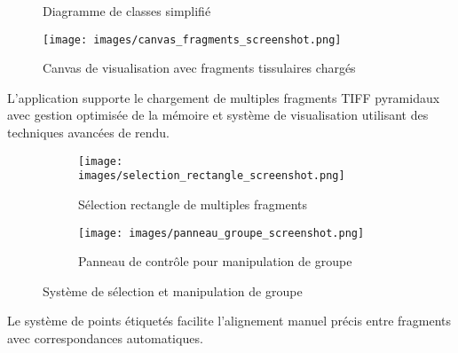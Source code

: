 \documentclass[12pt,a4paper]{report}
\begin{document}
\begin{figure}[H]
\caption{Diagramme de classes simplifié}
\end{figure}

\begin{figure}[H]
\centering
\texttt{[image: images/canvas\_fragments\_screenshot.png]}
\caption{Canvas de visualisation avec fragments tissulaires chargés}
\label{fig:canvas_fragments}
\end{figure}

L'application supporte le chargement de multiples fragments TIFF pyramidaux avec gestion optimisée de la mémoire et système de visualisation utilisant des techniques avancées de rendu.

\begin{figure}[H]
\centering
\begin{subfigure}{0.48\textwidth}
\texttt{[image: images/selection\_rectangle\_screenshot.png]}
\caption{Sélection rectangle de multiples fragments}
\end{subfigure}
\hfill
\begin{subfigure}{0.48\textwidth}
\texttt{[image: images/panneau\_groupe\_screenshot.png]}
\caption{Panneau de contrôle pour manipulation de groupe}
\end{subfigure}
\caption{Système de sélection et manipulation de groupe}
\label{fig:selection_groupe}
\end{figure}

Le système de points étiquetés facilite l'alignement manuel précis entre fragments avec correspondances automatiques.
\end{document}

